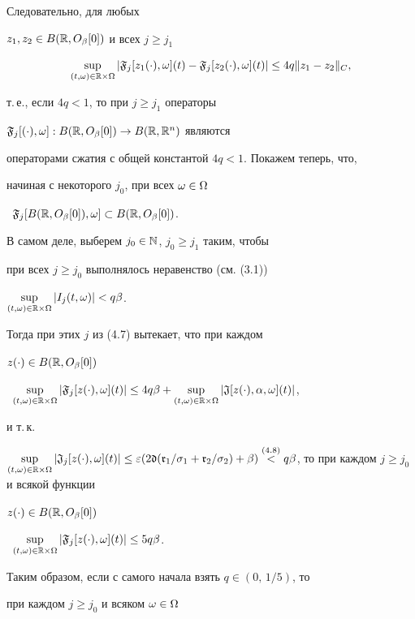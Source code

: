 Следовательно, для любых


$z_{1}, z_{2}\in B(\Bbb R,O_{\beta}[0])$ и всех $j\ge j_{1}$


\begin{equation}


\sup\lt_{(t,\om)\in\R\times\Om}|\frak F_{j}[z_{1}(\cdot),\om](t)


-\frak F_{j}[z_{2}(\cdot),\om](t)|\le 4q\|z_{1}-z_{2}\|_{C},


\end{equation}


т.\,е., если $4q<1$, то при $j\ge j_{1}$ операторы


$\frak F_{j}[(\cdot),\omega]: B(\Bbb R,O_{\beta}[0])\to B(\Bbb R,\Bbb R^{n})$ являются


операторами сжатия с общей константой $4q<1$. Покажем теперь, что,


начиная с некоторого $j_{0}$, при всех $\omega\in\Omega$


\ $\frak F_{j}[B(\Bbb R,O_{\beta}[0]),\omega]\subset B(\Bbb R,O_{\beta}[0])$.


В самом деле, выберем $j_{0}\in\Bbb N$, $j_{0}\ge j_{1}$ таким, чтобы


при всех $j\ge j_{0}$ выполнялось неравенство (см. (3.1))


$\sup\limits_{(t,\omega)\in\Bbb R\times\Omega}|I_{j}(t,\omega)|<q\beta$.


Тогда при этих $j$ из (4.7) вытекает, что при каждом


$z(\cdot)\in B(\Bbb R,O_{\beta}[0])$


\ $\sup\lt_{(t,\om)\in\R\times\Om}|\frak F_{j}[z(\cdot),\om](t)|\le 4q\beta+


\sup\lt_{(t,\om)\in\R\times\Om}|\frak J[z(\cdot),\alpha,\om](t)|$,


и т.\,к.


$\sup\lt_{(t,\om)\in\R\times\Om}|\frak J_{j}[z(\cdot),\om](t)|\le\ve


(2\frak d(\frak r_{1}/\sigma_{1}+


\frak r_{2}/\sigma_{2})+\beta)\overset{(4.8)}{<}{}


q\beta$, то при каждом $j\ge j_{0}$ и всякой функции


$z(\cdot)\in B(\Bbb R,O_{\beta}[0])$


\ $\sup\limits_{(t,\omega)\in\Bbb R\times\Omega}|\frak F_{j}[z(\cdot),\omega](t)|\le 5q\beta$.


Таким образом, если с самого начала взять $q\in (0,\,1/5)$, то


при каждом $j\ge j_{0}$ и всяком $\omega\in\Omega$


